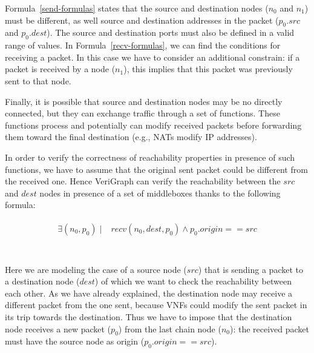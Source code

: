 Formula~\ref{send-formulas} states that the source and destination nodes (\textit{$n_0$} and \textit{$n_1$}) must be different, as well source and destination addresses in the packet (\textit{$p_0.src$} and \textit{$p_0.dest$}). The source and destination ports must also be defined in a valid range of values. In Formula~\ref{recv-formulas}, we can find the conditions for receiving a packet. In this case we have to consider an additional constrain: if a packet is received by a node (\textit{$n_1$}), this implies that this packet was previously sent to that node.   

Finally, it is possible that source and destination nodes may be no directly connected, but they can exchange traffic through a set of functions. These functions process and potentially can modify received packets before forwarding them toward the final destination (e.g., NATs modify IP addresses). 

In order to verify the correctness of reachability properties in presence of such functions, we have to assume that the original sent packet could be different from the received one. Hence VeriGraph can verify the reachability between the \textit{$src$} and \textit{$dest$} nodes in presence of a set of middleboxes thanks to the following formula:
\begin{figure}[h]
	{\footnotesize
		\begin{subequations}
			\begin{align}
				\begin{split}
				\exists (n_{0}, p_{0}) \; |&  \;  recv(n_{0}, dest, p_{0})  \wedge p_{0}.origin == src \\
				\end{split}
			\end{align}
			\label{formula}
		\end{subequations}}
\end{figure}
\\
Here we are modeling the case of a source node (\textit{$src$}) that is sending a packet to a destination node (\textit{$dest$})  of which we want to check the reachability between each other. As we have already explained, the destination node may receive a different packet from the one sent, because VNFs could modify the sent packet in its trip towards the destination. Thus we have to impose that the destination node receives a new packet (\textit{$p_{0}$}) from the last chain node (\textit{$n_{0}$}): the received packet  must have the source node as origin (\textit{$p_{0}.origin == src $}).

